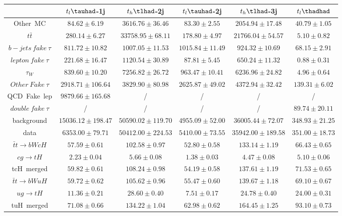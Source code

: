 \centering
\begin{tabular}{|c|c|c|c|c|c|} \hline
 & $t_{l}\tauhad$-1j & $t_{h}\tlhad$-2j & $t_{l}\tauhad$-2j & $t_{h}\tlhad$-3j & $t_{l}\thadhad$\\\hline
Other~MC & $84.62\pm6.19$ & $3616.76\pm36.46$ & $83.30\pm2.55$ & $2054.94\pm17.48$ & $40.79\pm1.05$\\\hline
$t\bar{t}$ & $280.14\pm6.27$ & $33758.95\pm68.11$ & $178.80\pm4.97$ & $21766.04\pm54.57$ & $5.10\pm0.82$\\\hline
$b-jets~fake~\tau$ & $811.72\pm10.82$ & $1007.05\pm11.53$ & $1015.84\pm11.49$ & $924.32\pm10.69$ & $68.15\pm2.91$\\\hline
$lepton~fake~\tau$ & $221.68\pm16.47$ & $1120.54\pm30.89$ & $87.81\pm5.45$ & $650.24\pm11.32$ & $0.88\pm0.31$\\\hline
$\tau_{W}$ & $839.60\pm10.20$ & $7256.82\pm26.72$ & $963.47\pm10.41$ & $6236.96\pm24.82$ & $4.96\pm0.64$\\\hline
$Other~Fake~\tau$ & $2918.71\pm106.64$ & $3829.90\pm80.98$ & $2625.87\pm49.02$ & $4372.94\pm32.42$ & $139.31\pm6.02$\\\hline
QCD~Fake~lep & $9879.66\pm165.68$ &  / &  / &  / &  /\\\hline
$double~fake~\tau$ &  / &  / &  / &  / & $89.74\pm20.11$\\\hline
background & $15036.12\pm198.47$ & $50590.02\pm119.70$ & $4955.09\pm52.00$ & $36005.44\pm72.07$ & $348.93\pm21.25$\\\hline
data & $6353.00\pm79.71$ & $50412.00\pm224.53$ & $5410.00\pm73.55$ & $35942.00\pm189.58$ & $351.00\pm18.73$\\\hline
$\bar{t}t\to bWcH$ & $57.59\pm0.61$ & $102.58\pm0.97$ & $52.80\pm0.58$ & $133.14\pm1.19$ & $66.43\pm0.65$\\\hline
$cg\to tH$ & $2.23\pm0.04$ & $5.66\pm0.08$ & $1.38\pm0.03$ & $4.47\pm0.08$ & $5.10\pm0.06$\\\hline
tcH~merged & $59.82\pm0.61$ & $108.24\pm0.98$ & $54.19\pm0.58$ & $137.61\pm1.19$ & $71.53\pm0.65$\\\hline
$\bar{t}t\to bWuH$ & $59.72\pm0.62$ & $105.62\pm0.96$ & $55.47\pm0.60$ & $139.67\pm1.18$ & $69.10\pm0.67$\\\hline
$ug\to tH$ & $11.36\pm0.21$ & $28.60\pm0.40$ & $7.51\pm0.17$ & $24.78\pm0.40$ & $24.00\pm0.31$\\\hline
tuH~merged & $71.08\pm0.66$ & $134.22\pm1.04$ & $62.98\pm0.62$ & $164.45\pm1.25$ & $93.10\pm0.73$\\\hline
\end{tabular}
